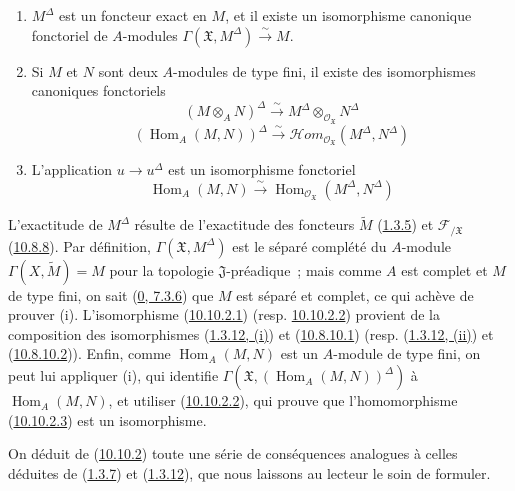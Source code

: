 \begin{proposition}[10.10.2]
\label{I.10.10.2-fr}
\medskip\noindent
\begin{enumerate}
  \item[\rm{(i)}] $M^\Delta$ est un foncteur exact en $M$, et il existe
    un isomorphisme canonique fonctoriel de $A$-modules
    $\Gamma(\mathfrak{X},M^\Delta)\xrightarrow{\sim}M$.
  \item[\rm{(ii)}] Si $M$ et $N$ sont deux $A$-modules de type fini, il
    existe des isomorphismes canoniques fonctoriels
    \[
      (M\otimes_A N)^\Delta
      \xrightarrow{\sim}
      M^\Delta\otimes_{\mathscr{O}_{\mathfrak{X}}}N^\Delta
      \tag{10.10.2.1}\label{I.10.10.2.1-fr}
    \]
    \[
      (\operatorname{Hom}_A(M,N))^\Delta
      \xrightarrow{\sim}
      \mathscr{H}\!om_{\mathscr{O}_{\mathfrak{X}}}
      (M^\Delta,N^\Delta)
      \tag{10.10.2.2}\label{I.10.10.2.2-fr}
    \]
  \item[\rm{(iii)}] L'application $u\to u^\Delta$ est un isomorphisme
    fonctoriel
    \[
      \operatorname{Hom}_A(M,N)
      \xrightarrow{\sim}
      \operatorname{Hom}_{\mathscr{O}_{\mathfrak{X}}}
      (M^\Delta,N^\Delta)
      \tag{10.10.2.3}\label{I.10.10.2.3-fr}
    \]
\end{enumerate}
\end{proposition}

L'exactitude de $M^\Delta$ résulte de l'exactitude des foncteurs
$\widetilde M$ (\hyperref[I.1.3.5-fr]{1.3.5}) et
$\mathscr{F}_{/\mathfrak{X}}$ (\hyperref[I.10.8.8-fr]{10.8.8}). Par
définition, $\Gamma(\mathfrak{X},M^\Delta)$ est le séparé complété du
$A$-module $\Gamma(X,\widetilde M)=M$ pour la topologie
$\mathfrak{J}$-préadique~; mais comme $A$ est complet et $M$ de type
fini, on sait (\hyperref[0.7.3.6-fr]{0, 7.3.6}) que $M$ est séparé et
complet, ce qui achève de prouver (i). L'isomorphisme
(\hyperref[I.10.10.2.1-fr]{10.10.2.1}) (resp.
\hyperref[I.10.10.2.2-fr]{10.10.2.2}) provient de la composition des
isomorphismes (\hyperref[I.1.3.12-fr]{1.3.12, (i)}) et
(\hyperref[I.10.8.10.1-fr]{10.8.10.1}) (resp.
(\hyperref[I.1.3.12-fr]{1.3.12, (ii)}) et
(\hyperref[I.10.8.10.2-fr]{10.8.10.2})). Enfin, comme
$\operatorname{Hom}_A(M,N)$ est un $A$-module de type fini, on peut lui
appliquer (i), qui identifie
$\Gamma(\mathfrak{X},(\operatorname{Hom}_A(M,N))^\Delta)$ à
$\operatorname{Hom}_A(M,N)$, et utiliser
(\hyperref[I.10.10.2.2-fr]{10.10.2.2}), qui prouve que
l'homomorphisme (\hyperref[I.10.10.2.3-fr]{10.10.2.3}) est un
isomorphisme.

On déduit de (\hyperref[I.10.10.2-fr]{10.10.2}) toute une série de
conséquences analogues à celles déduites de
(\hyperref[I.1.3.7-fr]{1.3.7}) et
(\hyperref[I.1.3.12-fr]{1.3.12}), que nous laissons au lecteur le soin
de formuler.

